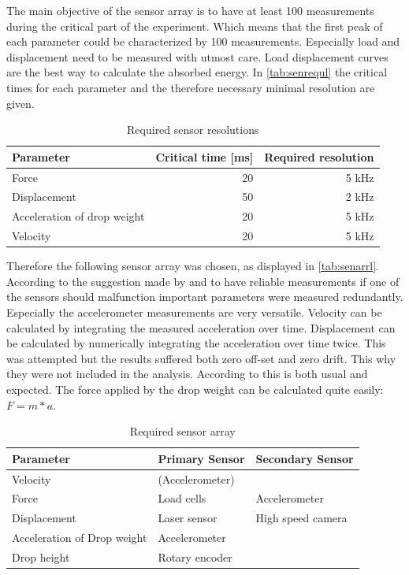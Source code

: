 The main objective of the sensor array is to have at least 100 measurements during the critical part of the experiment. Which means that the first peak of each parameter could be characterized by 100 measurements. Especially load and displacement need to be measured with utmost care. Load displacement curves are the best way to calculate the absorbed energy. \autocite[5]{player04} 
In \autoref{tab:senrequl} the critical times for each parameter and the therefore necessary minimal resolution are given.

\begin{table}[h]
    \centering
    \begin{tabular}{lrr}
    \toprule
         Parameter & Critical time [ms] & Required resolution \\
    \midrule
         Force & 20 & 5 kHz\\
         Displacement & 50 & 2 kHz \\
         Acceleration of drop weight & 20 & 5 kHz \\
         Velocity &  20 & 5 kHz \\
    \bottomrule
    \end{tabular}
    \caption{Required sensor resolutions}
    \label{tab:senrequl}
\end{table}

Therefore the following sensor array was chosen, as displayed in \autoref{tab:senarrl}. According to the suggestion made by \textcite{Erik15} and to have reliable measurements if one of the sensors should malfunction important parameters were measured redundantly. Especially the accelerometer measurements are very versatile. Velocity can be calculated by integrating the measured acceleration over time. Displacement can be calculated by numerically integrating the acceleration over time twice. This was attempted but the results suffered both zero off-set and zero drift. This why they were not included in the analysis. According to \textcite[3]{ansell02} this is both usual and expected.
The force applied by the drop weight can be calculated quite easily: \(F = m * a\). %

\begin{table}[h]
    \centering
    \begin{tabular}{lll}
    \toprule
         Parameter & Primary Sensor & Secondary Sensor  \\
    \midrule
         Velocity &  (Accelerometer) & \\
         Force & Load cells & Accelerometer \\
         Displacement & Laser sensor & High speed camera \\
         Acceleration of Drop weight & Accelerometer & \\
         Drop height & Rotary encoder & \\
    \bottomrule
    \end{tabular}
    \caption{Required sensor array}
    \label{tab:senarrl}
\end{table}

